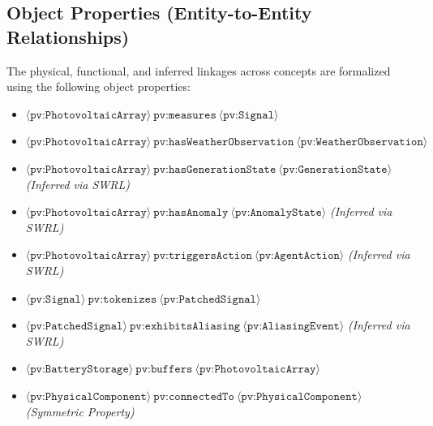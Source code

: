 \subsection{Object Properties (Entity-to-Entity Relationships)}
The physical, functional, and inferred linkages across concepts are formalized using the following object properties:
\begin{itemize}
    \item $\langle\texttt{pv:PhotovoltaicArray}\rangle \ \texttt{pv:measures} \ \langle\texttt{pv:Signal}\rangle$
    \item $\langle\texttt{pv:PhotovoltaicArray}\rangle \ \texttt{pv:hasWeatherObservation} \ \langle\texttt{pv:WeatherObservation}\rangle$
    \item $\langle\texttt{pv:PhotovoltaicArray}\rangle \ \texttt{pv:hasGenerationState} \ \langle\texttt{pv:GenerationState}\rangle$ \quad \textit{(Inferred via SWRL)}
    \item $\langle\texttt{pv:PhotovoltaicArray}\rangle \ \texttt{pv:hasAnomaly} \ \langle\texttt{pv:AnomalyState}\rangle$ \quad \textit{(Inferred via SWRL)}
    \item $\langle\texttt{pv:PhotovoltaicArray}\rangle \ \texttt{pv:triggersAction} \ \langle\texttt{pv:AgentAction}\rangle$ \quad \textit{(Inferred via SWRL)}
    \item $\langle\texttt{pv:Signal}\rangle \ \texttt{pv:tokenizes} \ \langle\texttt{pv:PatchedSignal}\rangle$
    \item $\langle\texttt{pv:PatchedSignal}\rangle \ \texttt{pv:exhibitsAliasing} \ \langle\texttt{pv:AliasingEvent}\rangle$ \quad \textit{(Inferred via SWRL)}
    \item $\langle\texttt{pv:BatteryStorage}\rangle \ \texttt{pv:buffers} \ \langle\texttt{pv:PhotovoltaicArray}\rangle$
    \item $\langle\texttt{pv:PhysicalComponent}\rangle \ \texttt{pv:connectedTo} \ \langle\texttt{pv:PhysicalComponent}\rangle$ \quad \textit{(Symmetric Property)}
\end{itemize}

